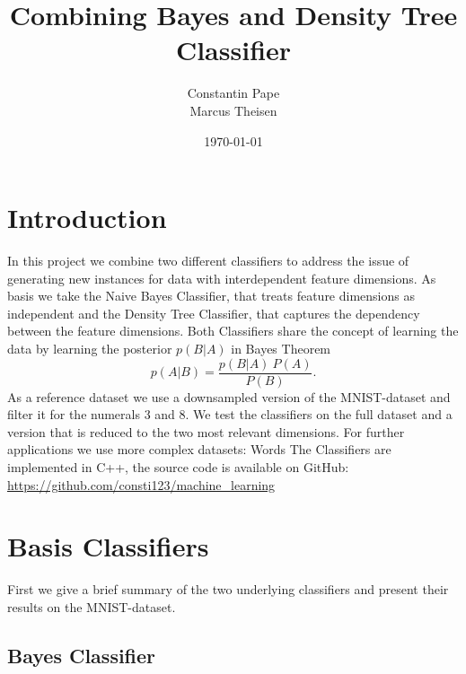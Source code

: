 \documentclass[draft]{article}
\title{Combining Bayes and Density Tree Classifier}
\author{Constantin Pape\\
        Marcus Theisen}
\date{\today}
\begin{document}
\maketitle

\section{Introduction}

In this project we combine two different classifiers to address the issue of generating new instances for data with interdependent feature dimensions. As basis we take the Naive Bayes Classifier, that treats feature dimensions as independent and the Density Tree Classifier, that captures the dependency between the feature dimensions. 
\newline
Both Classifiers share the concept of learning the data by learning the posterior $p(B|A)$ in Bayes Theorem 
\begin{equation} \label{eq1}
	p(A|B) = \frac{p(B|A) ~ P(A)}{P(B)} .
\end{equation}
As a reference dataset we use a downsampled version of the MNIST-dataset and filter it for the numerals 3 and 8. We test the classifiers on the full dataset and a version that is reduced to the two most relevant dimensions.
For further applications we use more complex datasets: Words %
\newline
The Classifiers are implemented in C++, the source code is available on GitHub: \newline
\url{https://github.com/consti123/machine_learning}

\section{Basis Classifiers}

First we give a brief summary of the two underlying classifiers and present their results on the MNIST-dataset.

\subsection{Bayes Classifier}
\end{document}
